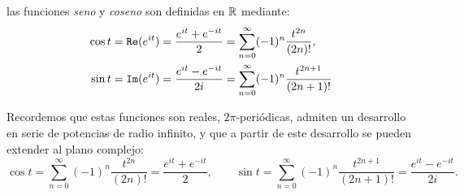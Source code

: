 \begin{defi}
    las funciones {\it seno} y {\it coseno} son definidas en \(\mathbb{R}\) mediante:
    \begin{equation*}        
        \begin{split}
        \cos t =  \mathtt{Re}(e^{it}) = \frac{e^{it} + e^{-it}}{2} &= \sum_{n=0}^{\infty} (-1)^n \frac{t^{2n}}{(2n)!}, \\
        \sin t =  \mathtt{Im}(e^{it}) = \frac{e^{it} - e^{-it}}{2i} &= \sum_{n=0}^{\infty} (-1)^{n} \frac{t^{2n+1}}{(2n+1)!}        
        \end{split}
    \end{equation*}
\end{defi}
Recordemos que estas funciones son reales, \(2\pi\)-periódicas, admiten un desarrollo en serie de potencias de radio infinito, y que a partir de este desarrollo
se pueden extender al plano complejo:
\[
\cos t = \sum_{n=0}^{\infty} (-1)^n \frac{t^{2n}}{(2n)!} = \frac{e^{it} + e^{-it}}{2}, \qquad \sin t = \sum_{n=0}^{\infty} (-1)^{n} \frac{t^{2n+1}}{(2n+1)!}= \frac{e^{it} - e^{-it}}{2i}.
\]

